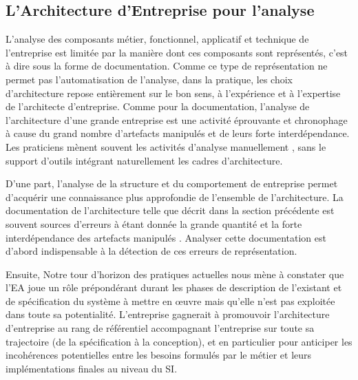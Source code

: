 	\subsection{L'Architecture d'Entreprise pour l'analyse}
	
	L'analyse des composants métier, fonctionnel, applicatif et technique de l'entreprise est limitée par la manière dont ces composants sont représentés, c'est à dire sous la forme de documentation. Comme ce type de représentation ne permet pas l'automatisation de l'analyse, dans la pratique, les choix d'architecture repose entièrement sur le bon sens, à l'expérience et à l'expertise de l'architecte d'entreprise. Comme pour la documentation, l'analyse de l'architecture d'une grande entreprise est une activité éprouvante et chronophage à cause du grand nombre d'artefacts manipulés et de leurs forte interdépendance. Les praticiens mènent souvent les activités d'analyse manuellement \cite{barn2013enterprise}, sans le support d'outils intégrant naturellement les cadres d'architecture.
	
	D'une part, l'analyse de la structure et du comportement de entreprise permet d'acquérir une connaissance plus approfondie de l'ensemble de l'architecture. La documentation de l'architecture telle que décrit dans la section précédente est souvent sources d'erreurs à étant donnée la grande quantité et la forte interdépendance des artefacts manipulés \cite{kaisler_enterprise_2005}. Analyser cette documentation est d'abord indispensable à la détection de ces erreurs de représentation.
	
	Ensuite, Notre tour d'horizon des pratiques actuelles nous mène à constater que l'EA joue un rôle prépondérant durant les phases de description de l'existant et de spécification du système à mettre en œuvre mais qu'elle n'est pas exploitée dans toute sa potentialité. L'entreprise gagnerait à promouvoir l'architecture d'entreprise au rang de référentiel accompagnant l'entreprise sur toute sa trajectoire (de la spécification à la conception), et en particulier pour anticiper les incohérences potentielles entre les besoins formulés par le métier et leurs implémentations finales au niveau du SI.
	
